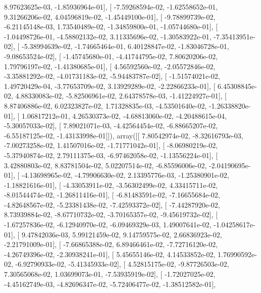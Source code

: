 \documentclass{article}
\begin{document}
          8.97623625e-03,  -1.85936964e-01],
       [ -7.59268594e-02,  -1.62558652e-01,   9.31266206e-02,
          4.04596819e-02,  -1.45449100e-01],
       [ -9.78899739e-02,  -6.21145148e-03,   1.73540489e-02,
         -1.34859800e-01,  -1.05744680e-01],
       [ -1.04498726e-01,  -4.58802132e-02,   3.11335696e-02,
         -1.30583922e-01,  -7.35413951e-02],
       [ -5.38994639e-02,  -1.74665464e-01,   6.40128847e-02,
         -1.83046728e-01,  -9.08653524e-02],
       [ -1.45745680e-01,  -4.41744795e-02,   7.80620206e-02,
          1.79796197e-02,  -1.41380685e-01],
       [  4.56592560e-02,  -2.05572846e-02,  -3.35881292e-02,
         -4.01731183e-02,  -5.94483787e-02],
       [ -1.51574021e-02,   1.49720429e-04,  -3.77653709e-02,
          3.13929289e-02,  -2.22866233e-01],
       [  6.45308845e-02,   4.88330083e-02,  -5.82506961e-02,
          2.64378578e-03,  -1.41224927e-01],
       [  8.87406886e-02,   6.02323827e-02,   1.71328835e-03,
         -4.53501640e-02,  -1.26338820e-01],
       [  1.06817212e-01,   4.26530373e-02,  -4.68813060e-02,
         -4.20488615e-04,  -5.30057033e-02],
       [  7.89021071e-03,  -4.42564454e-02,  -6.88665207e-02,
         -6.55187125e-02,  -1.43133998e-01]]), array([[  7.80542974e-02,  -8.32616793e-03,  -7.00273258e-02,
          1.41507016e-02,  -1.71771042e-01],
       [ -8.06980219e-02,  -5.37940874e-02,   2.79111375e-03,
         -6.97462058e-02,  -1.13556224e-01],
       [  3.42880803e-02,   8.83781504e-02,   5.02207514e-02,
         -6.85596006e-02,  -2.04190695e-01],
       [ -4.13698965e-02,  -4.79906630e-02,   2.13395776e-03,
         -1.25380901e-02,  -1.18821616e-01],
       [ -4.33053911e-02,  -3.56302499e-02,   4.33415711e-02,
         -8.01544474e-02,  -1.26811416e-01],
       [ -6.81483591e-02,  -7.16655684e-02,  -4.82648567e-02,
         -5.23381438e-02,  -7.42593372e-02],
       [ -7.44287920e-02,   8.73939884e-02,  -8.67710732e-02,
         -3.70165357e-02,  -9.45619732e-02],
       [ -1.67257836e-02,  -6.12940970e-02,  -6.09469329e-03,
          1.49007641e-02,  -1.04258617e-01],
       [  9.47842036e-03,   5.99121459e-02,   9.14759575e-02,
          2.66836923e-02,  -2.21791009e-01],
       [ -7.66865388e-02,   6.89466461e-02,  -7.72716120e-02,
         -4.26749396e-02,  -2.30938241e-01],
       [  5.45655146e-02,   4.14533852e-02,   1.76990592e-02,
         -6.92790933e-02,  -5.41345933e-02],
       [  4.52815175e-02,  -9.87726503e-02,   7.30565068e-02,
          1.03699073e-01,  -7.53935919e-02],
       [ -1.72027025e-02,  -4.45162749e-03,  -4.82696347e-02,
         -5.72406477e-02,  -1.38512582e-01],
\end{document}
